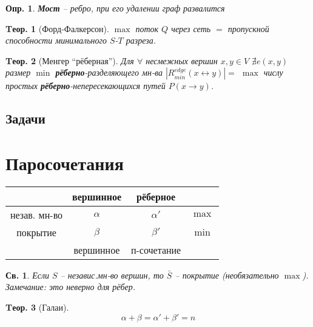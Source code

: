 \documentclass[a4paper,12pt]{article}
\newtheorem{definition}{Опр.}[section]
\newtheorem{property}{Св.}[definition]
\newtheorem{theorem}{Tеор.}[section]
\begin{document}
\begin{definition}
	\textbf{Мост} -- ребро, при его удалении граф развалится
\end{definition}

\begin{theorem}[Форд-Фалкерсон]
	$\max$ поток $Q$ через сеть $=$ пропускной способности минимального $S$-$T$ разреза.
\end{theorem}

\begin{theorem}[Менгер ``рёберная'']
	Для $\forall$ несмежных вершин $x,y \in V$ $\nexists e(x,y)$ размер $\min$ \textbf{рёберно}-разделяющего мн-ва $|R^{edge}_{min}(x \leftrightarrow y)|=$ $\max$ числу простых \textbf{рёберно}-непересекающихся путей $P(x \rightarrow y)$.
\end{theorem}

\subsection{Задачи}

\section{Паросочетания}

\begin{center}
  \begin{tabular}{|c|c|c|c|}
	\cline{2-3}
	\multicolumn{1}{c|}{} & вершинное & рёберное     & \multicolumn{1}{|c}{} \\ \hline
	незав. мн-во          & $\alpha$  & $\alpha'$    & $\max$                \\ \hline
	покрытие              & $\beta$   & $\beta'$     & $\min$                \\ \hline
	\multicolumn{1}{c|}{} & вершинное & п-сочетание  & \multicolumn{1}{|c}{} \\ \cline{2-3}
  \end{tabular}
\end{center}

\begin{property}
	Если $S$ -- независ.мн-во вершин, то $\bar{S}$ -- покрытие (необязательно $\max$).\\
	Замечание: это неверно для рёбер.
\end{property}

\begin{theorem}[Галаи]
	\[ \alpha + \beta = \alpha' + \beta' = n \]
\end{theorem}
\end{document}
